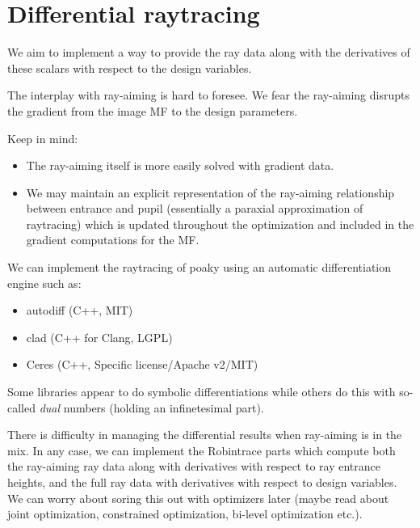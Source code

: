 \section{Differential raytracing}
We aim to implement a way to provide the ray data along with the derivatives of
these scalars with respect to the design variables.

The interplay with ray-aiming is hard to foresee. We fear the ray-aiming
disrupts the gradient from the image MF to the design parameters.

Keep in mind:

\begin{itemize}
\item The ray-aiming itself is more easily solved with gradient data.
\item We may maintain an explicit representation of the ray-aiming relationship
between entrance and pupil (essentially a paraxial approximation of raytracing)
which is updated throughout the optimization and included in the gradient
computations for the MF.
\end{itemize}

We can implement the raytracing of poaky using an automatic differentiation
engine such as:

\begin{itemize}
\item autodiff (C++, MIT)
\item clad (C++ for Clang, LGPL)
\item Ceres (C++, Specific license/Apache v2/MIT)
\end{itemize}

Some libraries appear to do symbolic differentiations while others do
this with so-called \emph{dual} numbers (holding an infinetesimal part).

There is difficulty in managing the differential results when ray-aiming is
in the mix. In any case, we can implement the Robintrace parts which
compute both the ray-aiming ray data along with derivatives with respect
to ray entrance heights, and the full ray data with derivatives with respect
to design variables. We can worry about soring this out with optimizers later
(maybe read about joint optimization, constrained optimization, bi-level
optimization etc.).
